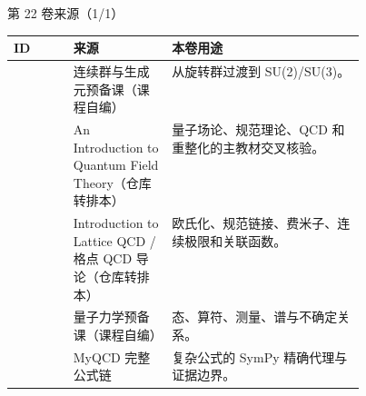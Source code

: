 \begin{frame}[t]{第 22 卷来源（1/1）}
\scriptsize\begin{tabularx}{\linewidth}{p{0.17\linewidth}p{0.28\linewidth}Y}
\toprule ID & 来源 & 本卷用途\\\midrule
{} & 连续群与生成元预备课（课程自编） & 从旋转群过渡到 SU(2)/\allowbreak{}SU(3)。\\
 & An Introduction to Quantum Field Theory（仓库转排本） & 量子场论、规范理论、QCD 和重整化的主教材交叉核验。\\
 & Introduction to Lattice QCD /\allowbreak{} 格点 QCD 导论（仓库转排本） & 欧氏化、规范链接、费米子、连续极限和关联函数。\\
 & 量子力学预备课（课程自编） & 态、算符、测量、谱与不确定关系。\\
 & MyQCD 完整公式链 & 复杂公式的 SymPy 精确代理与证据边界。\\
\bottomrule\end{tabularx}\end{frame}

